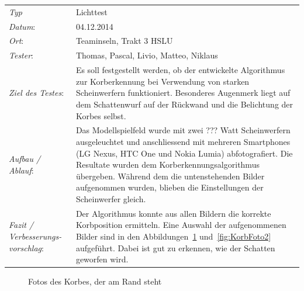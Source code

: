 \begin{tabular}{p{3.6cm}p{\textwidth-3.6cm-0.7cm}}
	\rule{0pt}{11pt}\textit{Typ}              & Lichttest  \\ 
	\rule{0pt}{11pt}\textit{Datum}:           & 04.12.2014   \\
	\rule{0pt}{11pt}\textit{Ort}:             & Teaminseln, Trakt 3 HSLU \\
	\rule{0pt}{11pt}\textit{Tester}:          & Thomas, Pascal, Livio, Matteo, Niklaus\\
	\rule{0pt}{11pt}\textit{Ziel des Testes}: & Es soll festgestellt werden, ob der entwickelte 
	Algorithmus zur Korberkennung bei Verwendung von starken Scheinwerfern funktioniert. Besonderes Augenmerk liegt auf dem Schattenwurf auf der Rückwand und die Belichtung der Korbes selbst. \\
	\rule{0pt}{11pt}\textit{Aufbau / Ablauf}: & Das Modellspielfeld wurde mit zwei ??? Watt 
	Scheinwerfern ausgeleuchtet und anschliessend mit mehreren Smartphones (LG Nexus, HTC One 
	und Nokia Lumia) abfotografiert. Die Resultate wurden dem Korberkennungsalgorithmus übergeben. 
	Während dem die untenstehenden Bilder aufgenommen wurden, blieben die Einstellungen der 
	Scheinwerfer gleich.\\
	\rule{0pt}{11pt}\textit{Fazit / Verbesserungs-\newline vorschlag}: & Der Algorithmus konnte 
	aus allen Bildern die korrekte Korbposition ermitteln. Eine Auswahl der aufgenommenen Bilder 
	sind in den Abbildungen~\ref{fig:KorbFoto1} und~\ref{fig:KorbFoto2} aufgeführt. Dabei ist gut 
	zu erkennen, wie der Schatten geworfen wird.\\
\end{tabular}
%
\vspace{0.2cm}
%
\begin{figure}[h!]
\hfill
{}
\caption{Fotos des Korbes, der am Rand steht}
\label{fig:KorbFoto1}
\end{figure}

